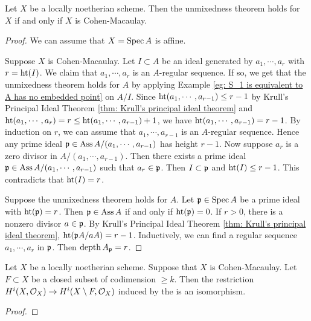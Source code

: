     \begin{theorem}\label{thm: unmixedness theorem for Cohen-Macaulay schemes}
        Let $X$ be a locally noetherian scheme.
        Then the unmixedness theorem holds for $X$ if and only if $X$ is Cohen-Macaulay.
    \end{theorem}
    \begin{proof}
        We can assume that $X = \operatorname{Spec} A$ is affine.

        Suppose $X$ is Cohen-Macaulay.
        Let $I \subset A$ be an ideal generated by $a_1,\cdots,a_r$ with $r = \operatorname{ht}(I)$.
        We claim that $a_1,\cdots,a_r$ is an $A$-regular sequence.
        If so, we get that the unmixedness theorem holds for $A$ by applying Example \ref{eg: S_1 is equivalent to A has no embedded point} on $A/I$. 
        Since $\operatorname{ht}(a_1,\cdots,a_{r-1}) \leq r-1$ by Krull's Principal Ideal Theorem \ref{thm: Krull's principal ideal theorem} and $\operatorname{ht}(a_1,\cdots,a_r) = r \leq \operatorname{ht}(a_1,\cdots,a_{r-1}) + 1$, we have $\operatorname{ht}(a_1,\cdots,a_{r-1}) = r-1$.
        By induction on $r$, we can assume that $a_1,\cdots,a_{r-1}$ is an $A$-regular sequence.
        Hence any prime ideal ${\mathfrak{p}} \in \operatorname{Ass} A/(a_1,\cdots,a_{r-1})$ has height $r-1$.
        Now suppose $a_r$ is a zero divisor in $A/(a_1,\cdots,a_{r-1})$.
        Then there exists a prime ideal ${\mathfrak{p}} \in \operatorname{Ass} A/(a_1,\cdots,a_{r-1})$ such that $a_r \in {\mathfrak{p}}$.
        Then $I \subset {\mathfrak{p}}$ and $\operatorname{ht}(I) \leq r-1$.
        This contradicts that $\operatorname{ht}(I) = r$.
        
        Suppose the unmixedness theorem holds for $A$.
        Let ${\mathfrak{p}} \in \operatorname{Spec} A$ be a prime ideal with $\operatorname{ht}({\mathfrak{p}}) = r$.
        Then ${\mathfrak{p}} \in \operatorname{Ass} A$ if and only if $\operatorname{ht}({\mathfrak{p}}) = 0$.
        If $r > 0$, there is a nonzero divisor $a \in {\mathfrak{p}}$.
        By Krull's Principal Ideal Theorem \ref{thm: Krull's principal ideal theorem}, $\operatorname{ht}({\mathfrak{p}} A/aA) = r-1$.
        Inductively, we can find a regular sequence $a_1,\cdots,a_r$ in ${\mathfrak{p}}$.
        Then $\operatorname{depth} A_{\mathfrak{p}} = r$.
    \end{proof}

    \begin{theorem}\label{thm: higher dimensional hartogs lemma for Cohen-Macaulay schemes}
        Let $X$ be a locally noetherian scheme.
        Suppose that $X$ is Cohen-Macaulay.
        Let $F \subset X$ be a closed subset of codimension $\geq k$.
        Then the restriction $H^i(X,{\mathcal{O}}_X) \to H^i(X\setminus F, {\mathcal{O}}_{X})$ induced by the 
         is an isomorphism.
    \end{theorem}
    \begin{proof}
    \end{proof}


